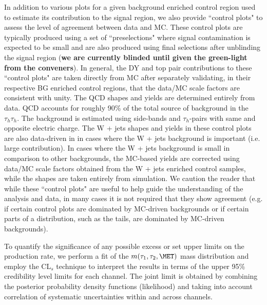 In addition to various plots for a given background enriched control region used to estimate its contribution 
to the signal region, we also provide ``control plots" to assess the level of agreement between data and MC. These control plots are 
typically produced using a set of ``preselections" where signal contamination is expected to be small and are also produced 
using final selections after unblinding the signal region (\textbf{we are currently blinded until given the green-light from the conveners}). 
In general, the DY and top pair contributions to these ``control plots" 
are taken directly from MC after separately validating, in their respective BG enriched control regions, that the data/MC scale factors are consistent 
with unity. The QCD shapes and yields are determined entirely from data. QCD accounts for roughly 90\% of the total source of background in the 
$\tau_{h} \tau_{h}$. The background is estimated using \MET side-bands and $\tau_{h}$-pairs with same and opposite electric charge. 
The W + jets shapes and yields in these control plots are also data-driven in 
in cases where the W + jets background is important (i.e. large contribution). In cases where the W + jets background is small in comparison to other backgrounds, 
the MC-based yields are corrected using data/MC scale factors obtained from the W + jets enriched control samples, while the shapes are taken entirely from simulation. 
We caution the reader that while these ``control plots" are useful to help guide the 
understanding of the analysis and data, in many cases it is not required that they show agreement (e.g. if certain control plots are dominated by MC-driven backgrounds or 
if certain parts of a distribution, such as the tails, are dominated by MC-driven backgrounds). 

To quantify the significance of any possible excess or set upper limits on the production rate, we perform a fit of the $m(\tau_{1},\tau_{2},\MET)$ mass 
distribution and employ the CL$_{s}$ technique to interpret the results in terms of the upper 95\% credibility level limits
for each channel. The joint limit is obtained by combining the posterior probability density functions (likelihood) and taking into
account correlation of systematic uncertainties within and across channels.

